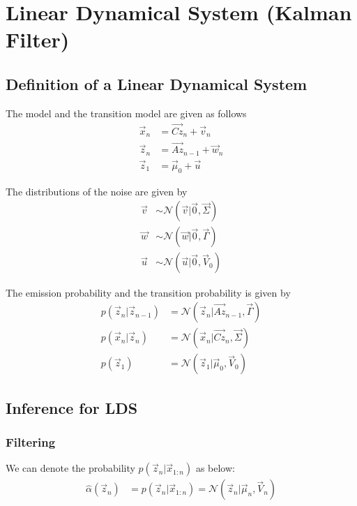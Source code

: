 \documentclass[12pt,twoside]{article}
\begin{document}
\newpage

\section{Linear Dynamical System (Kalman Filter)}

\subsection{Definition of a Linear Dynamical System}
The model and the transition model are given as follows
\begin{align*}
	\vec{x}_n 		 	&= \vec{Cz}_n +\vec{v}_n \\	
	\vec{z}_n 			&= \vec{Az}_{n-1} + \vec{w}_n\\
	\vec{z}_1			&= \vec{\mu}_0 + \vec{u}
\end{align*}

The distributions of the noise are given by
\begin{align*}
	\vec{v}				& \sim \mathcal{N}(\vec{v} \vert \vec{0},\vec{\Sigma}) \\
	\vec{w}				&\sim \mathcal{N}(\vec{w} \vert \vec{0},\vec{\Gamma}) \\
	\vec{u}				& \sim \mathcal{N}(\vec{u} \vert \vec{0}, \vec{V}_0)
\end{align*}

The emission probability and the transition probability is given by
\begin{align*}
	p(\vec{z}_n \vert \vec{z}_{n-1})		& = \mathcal{N} (\vec{z}_n \vert \vec{Az}_{n-1}, \vec{\Gamma})\\
	p(\vec{x}_n \vert \vec{z}_n)				& = \mathcal{N} (\vec{x}_n \vert \vec{Cz}_n, \vec{\Sigma}) \\
	p(\vec{z}_1) 									& = \mathcal{N} (\vec{z}_1 \vert \vec{\mu}_0, \vec{V}_0)
\end{align*}

\subsection{Inference for LDS}
\subsubsection{Filtering}

We can denote the probability $ p(\vec{z}_n \vert \vec{x}_{1:n})$ as below:
\begin{align*}
	\hat{\alpha} (\vec{z}_n)	& = p(\vec{z}_n \vert \vec{x}_{1:n}) = \mathcal{N} (\vec{z}_n\vert \vec{\mu}_n, \vec{V}_n)
\end{align*}
\end{document}

